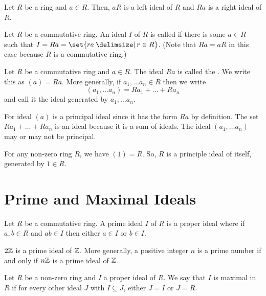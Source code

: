 \documentclass[11pt]{penrose}
\begin{document}
\begin{nlemma}
    Let $R$ be a ring and $a \in R$. Then, $aR$ is a left ideal of $R$ and $Ra$ is a right ideal of $R$.
\end{nlemma}

\begin{ndfn}
    Let $R$ be a commutative ring. An ideal $I$ of $R$ is called  if there is some $a \in R$ such that $I = Ra = \set{ra \st r \in R}$. (Note that $Ra = aR$ in this case because $R$ is a commutative ring.)
\end{ndfn}

\begin{ndfn}
    Let $R$ be a commutative ring and $a \in R$. The ideal $Ra$ is called the . We write this as $(a) = Ra$. More generally, if $a_1, \dots a_n \in R$ then we write
    \begin{equation*}
        (a_1, \dots a_n) = Ra_1 + \dots + Ra_n
    \end{equation*}
    and call it the ideal generated by $a_1, \dots a_n$.
\end{ndfn}

\begin{remark}
    For ideal $(a)$ is a principal ideal since it has the form $Ra$ by definition. The set $Ra_1 + \dots + Ra_n$ is an ideal because it is a sum of ideals. The ideal $(a_1, \dots a_n)$ may or may not be principal.
\end{remark}

\begin{negg}
    For any non-zero ring $R$, we have $(1) = R$. So, $R$ is a principle ideal of itself, generated by $1 \in R$.
\end{negg}

\section{Prime and Maximal Ideals}
\begin{ndfn}
    Let $R$ be a commutative ring. A prime ideal $I$ of $R$ is a proper ideal where if $a, b \in R$ and $ab \in I$ then either $a \in I$ or $b \in I$.
\end{ndfn}

\begin{negg}
    $2\mathbb{Z}$ is a prime ideal of $\mathbb{Z}$. More generally, a positive integer $n$ is a prime number if and only if $n\mathbb{Z}$ is a prime ideal of $\mathbb{Z}$.
\end{negg}

\begin{ndfn}
    Let $R$ be a non-zero ring and $I$ a proper ideal of $R$. We say that $I$ is maximal in $R$ if for every other ideal $J$ with $I \subseteq J$, either $J = I$ or $J = R$.
\end{ndfn}
\end{document}
